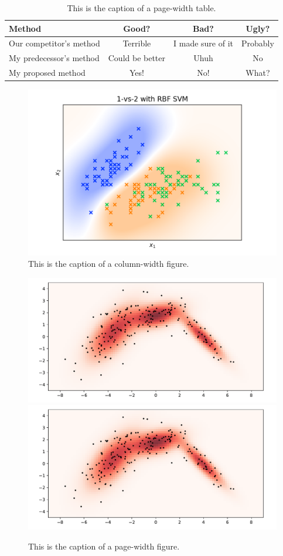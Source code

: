 \documentclass[10pt,twocolumn,letterpaper]{article}
\begin{document}
\begin{table}
   \begin{center}
   \begin{tabular}{|l|c|c|c|}
   \hline
   Method & Good? & Bad? & Ugly? \\
   \hline\hline
   Our competitor's method & Terrible & I made sure of it & Probably \\
   My predecessor's method & Could be better & Uhuh & No \\
   My proposed method  & Yes! & No! & What? \\
   \hline
   \end{tabular}
   \end{center}
   \caption{This is the caption of a page-width table.\label{second_table}}
\end{table}



\begin{figure}
   \begin{center}
   \includegraphics[width=\linewidth]{sample_image.png}
   \end{center}
      \caption{This is the caption of a column-width figure.\label{first_figure}}
\end{figure}
   

\begin{figure}
   \begin{center}
      \includegraphics[width=0.4\linewidth]{sample_image.pdf}
      \includegraphics[width=0.4\linewidth]{sample_image.pdf}
   \end{center}
      \caption{This is the caption of a page-width figure.\label{second_figure}}
\end{figure}





{\small


}
\end{document}
